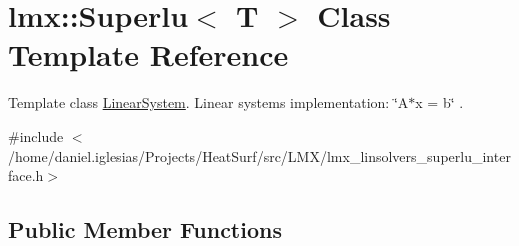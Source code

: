 \hypertarget{classlmx_1_1Superlu}{\section{lmx\-:\-:Superlu$<$ T $>$ Class Template Reference}
\label{classlmx_1_1Superlu}
}


Template class \hyperlink{classlmx_1_1LinearSystem}{Linear\-System}. Linear systems implementation\-: \char`\"{}\-A$\ast$x = b\char`\"{} .  




{\ttfamily \#include $<$/home/daniel.\-iglesias/\-Projects/\-Heat\-Surf/src/\-L\-M\-X/lmx\-\_\-linsolvers\-\_\-superlu\-\_\-interface.\-h$>$}

\subsection*{Public Member Functions}
